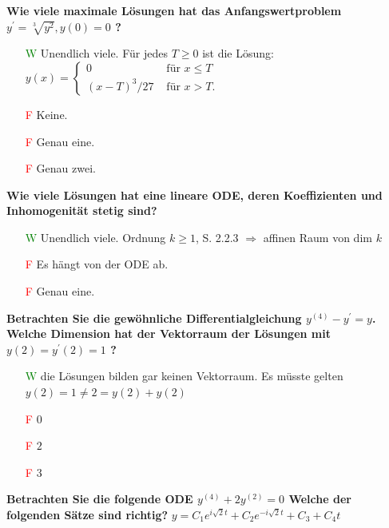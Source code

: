 \begin{flushleft}
\textbf{Wie viele maximale Lösungen hat das Anfangswertproblem $y^{\prime}=\sqrt[3]{y^2}, y(0)=0$ ?}

\begin{itemize}[leftmargin = *]
\item[\textcolor{green}{W}] Unendlich viele. \textcolor{Emerald}{Für jedes $T\geq 0$ ist die Lösung: $y(x)= \begin{cases}0 & \text { für } x \leq T \\ (x-T)^3 / 27 & \text { für } x>T .\end{cases}$} 
\item[\textcolor{red}{F}] Keine. 
\item[\textcolor{red}{F}] Genau eine.  
\item[\textcolor{red}{F}] Genau zwei.  
\end{itemize}

\textbf{Wie viele Lösungen hat eine lineare ODE, deren Koeffizienten und Inhomogenität stetig sind?}

\begin{itemize}[leftmargin = *]
\item[\textcolor{green}{W}] Unendlich viele. \textcolor{Emerald}{Ordnung $k\geq 1$, S. 2.2.3 $\Rightarrow$ affinen Raum von dim $k$} 
\item[\textcolor{red}{F}] Es hängt von der ODE ab.
\item[\textcolor{red}{F}] Genau eine.    
\end{itemize}







\textbf{Betrachten Sie die gewöhnliche Differentialgleichung $y^{(4)}-y^{\prime}=y$. Welche Dimension hat der Vektorraum der Lösungen mit $y(2)=y^{\prime}(2)=1$ ? }

\begin{itemize}[leftmargin = *]
\item[\textcolor{green}{W}] die Lösungen bilden gar keinen Vektorraum. \textcolor{Emerald}{Es müsste gelten $y(2)=1 \neq 2 = y(2)+y(2)$}
\item[\textcolor{red}{F}] $0$  
\item[\textcolor{red}{F}] $2$  
\item[\textcolor{red}{F}] $3$  
\end{itemize}

\textbf{Betrachten Sie die folgende ODE $y^{(4)}+2 y^{(2)}=0$ Welche der folgenden Sätze sind richtig?}
\textcolor{Emerald}{$y=C_1 e^{i \sqrt{2} t}+C_2 e^{-i \sqrt{2} t}+C_3+C_4 t$}


\end{flushleft}
